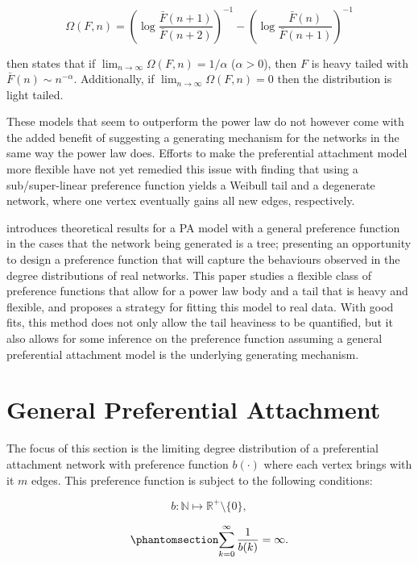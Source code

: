 \documentclass[
  sn-basic,
]{sn-jnl}
\theoremstyle{plain}
\theoremstyle{remark}
\begin{document}
\[
\Omega(F,n) = \left(\log\displaystyle\frac{\bar F (n+1)}{\bar F (n+2)}\right)^{-1} - \left(\log\displaystyle\frac{\bar F (n)}{\bar F (n+1)}\right)^{-1}
\]

\citep{shimura12} then states that if
\(\lim_{n\rightarrow\infty} \Omega(F,n) = 1/\alpha\) (\(\alpha>0\)),
then \(F\) is heavy tailed with \(\bar F(n) \sim n^{-\alpha}\).
Additionally, if \(\lim_{n\rightarrow\infty} \Omega(F,n) = 0\) then the
distribution is light tailed.

These models that seem to outperform the power law do not however come
with the added benefit of suggesting a generating mechanism for the
networks in the same way the power law does. Efforts to make the
preferential attachment model more flexible have not yet remedied this
issue with \citep{krapivsky01} finding that using a sub/super-linear
preference function yields a Weibull tail and a degenerate network,
where one vertex eventually gains all new edges, respectively.

\citep{rudas07} introduces theoretical results for a PA model with a
general preference function in the cases that the network being
generated is a tree; presenting an opportunity to design a preference
function that will capture the behaviours observed in the degree
distributions of real networks. This paper studies a flexible class of
preference functions that allow for a power law body and a tail that is
heavy and flexible, and proposes a strategy for fitting this model to
real data. With good fits, this method does not only allow the tail
heaviness to be quantified, but it also allows for some inference on the
preference function assuming a general preferential attachment model is
the underlying generating mechanism.

\section{General Preferential Attachment}\label{sec-gpa}

The focus of this section is the limiting degree distribution of a
preferential attachment network with preference function \(b(\cdot)\)
where each vertex brings with it \(m\) edges. This preference function
is subject to the following conditions:

\[
b:\mathbb N \mapsto \mathbb R^+\setminus\{0\},
\]

\begin{equation}\phantomsection\label{eq-condb2}{
\sum_{k=0}^\infty\frac{1}{b(k)} = \infty.
}\end{equation}
\end{document}
